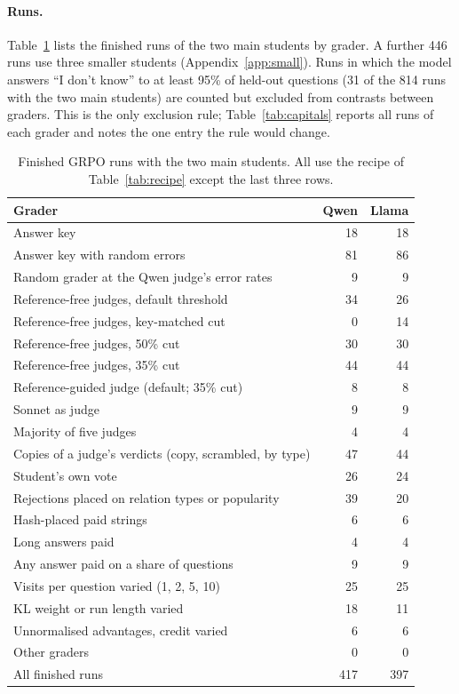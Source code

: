 \documentclass[11pt,a4paper,twocolumn]{article}
\newcommand{\idk}{``I don't know''}
\begin{document}
\paragraph{Runs.} Table~\ref{tab:runs} lists the finished runs of the two main students by grader. A further 446 runs use three smaller students (Appendix~\ref{app:small}). Runs in which the model answers \idk{} to at least 95\% of held-out questions (31 of the 814 runs with the two main students) are counted but excluded from contrasts between graders. This is the only exclusion rule; Table~\ref{tab:capitals} reports all runs of each grader and notes the one entry the rule would change.

\begin{table}[H]
\small
\centering
\begin{tabular}{@{}p{}rr@{}}
\toprule
Grader & Qwen & Llama \\
\midrule
Answer key & 18 & 18 \\
Answer key with random errors & 81 & 86 \\
Random grader at the Qwen judge's error rates & 9 & 9 \\
Reference-free judges, default threshold & 34 & 26 \\
Reference-free judges, key-matched cut & 0 & 14 \\
Reference-free judges, 50\% cut & 30 & 30 \\
Reference-free judges, 35\% cut & 44 & 44 \\
Reference-guided judge (default; 35\% cut) & 8 & 8 \\
Sonnet as judge & 9 & 9 \\
Majority of five judges & 4 & 4 \\
Copies of a judge's verdicts (copy, scrambled, by type) & 47 & 44 \\
Student's own vote & 26 & 24 \\
Rejections placed on relation types or popularity & 39 & 20 \\
Hash-placed paid strings & 6 & 6 \\
Long answers paid & 4 & 4 \\
Any answer paid on a share of questions & 9 & 9 \\
Visits per question varied (1, 2, 5, 10) & 25 & 25 \\
KL weight or run length varied & 18 & 11 \\
Unnormalised advantages, credit varied & 6 & 6 \\
Other graders & 0 & 0 \\
\midrule
All finished runs & 417 & 397 \\
\bottomrule
\end{tabular}
\caption{Finished GRPO runs with the two main students. All use the recipe of Table~\ref{tab:recipe} except the last three rows.}
\label{tab:runs}
\end{table}
\end{document}
